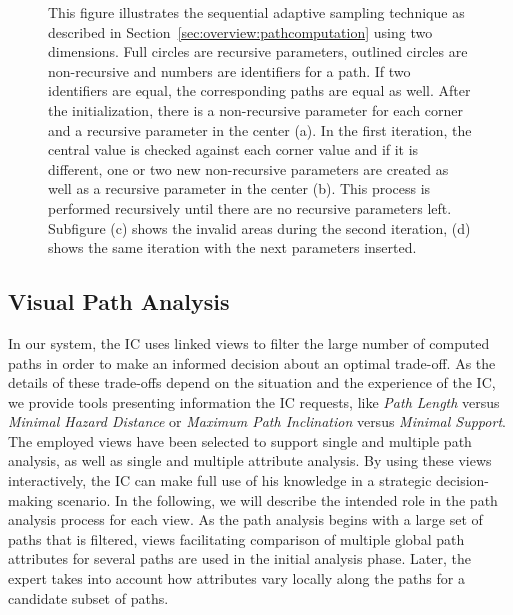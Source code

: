 \documentclass{egpubl}
\begin{document}
\begin{figure}
{		\label{fig:sampling:adaptive:4}
	}
	\hfill
	\caption{This figure illustrates the sequential adaptive sampling technique as described in Section~\ref{sec:overview:pathcomputation} using two dimensions. Full circles are recursive parameters, outlined circles are non-recursive and numbers are identifiers for a path. If two identifiers are equal, the corresponding paths are equal as well. After the initialization, there is a non-recursive parameter for each corner and a recursive parameter in the center (a). In the first iteration, the central value is checked against each corner value and if it is different, one or two new non-recursive parameters are created as well as a recursive parameter in the center (b). This process is performed recursively until there are no recursive parameters left. Subfigure (c) shows the invalid areas during the second iteration, (d) shows the same iteration with the next parameters inserted.}
	\label{fig:sampling:adaptive}
\end{figure}

\subsection{Visual Path Analysis} \label{sec:overview:pathanalysis}
In our system, the IC uses linked views to filter the large number of computed paths in order to make an informed decision about an optimal trade-off. As the details of these trade-offs depend on the situation and the experience of the IC, we provide tools presenting information the IC requests, like \emph{Path Length} versus \emph{Minimal Hazard Distance} or \emph{Maximum Path Inclination} versus \emph{Minimal Support}. The employed views have been selected to support single and multiple path analysis, as well as single and multiple attribute analysis. By using these views interactively, the IC can make full use of his knowledge in a strategic decision-making scenario. In the following, we will describe the intended role in the path analysis process for each view. As the path analysis begins with a large set of paths that is filtered, views facilitating comparison of multiple global path attributes for several paths are used in the initial analysis phase. Later, the expert takes into account how attributes vary locally along the paths for a candidate subset of paths.
\end{document}
